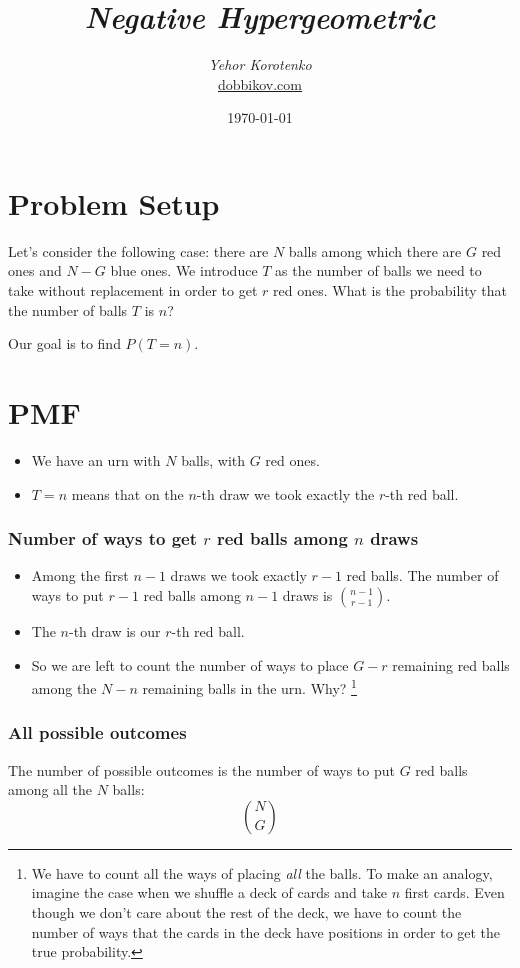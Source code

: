 \documentclass[12pt]{article}
\title{\textit{Negative Hypergeometric}}
\author{\textit{Yehor Korotenko}\\ \href{https://dobbikov.com}{dobbikov.com}}
\date{\today}
\begin{document}
\maketitle

\section*{Problem Setup}
Let's consider the following case: there are $N$ balls among which there are $G$
red ones and $N - G$ blue ones. We introduce $T$ as the number of balls we need
to take without replacement in order to get $r$ red ones. What is the probability 
that the number of balls $T$ is $n$?

Our goal is to find $P(T = n)$.

\section*{PMF}
\begin{itemize}
    \item We have an urn with $N$ balls, with $G$ red ones.
    \item $T = n$ means that on the $n$-th draw we took exactly the $r$-th red ball.
\end{itemize}

\subsubsection*{Number of ways to get $r$ red balls among $n$ draws}
\begin{itemize}
    \item Among the first $n-1$ draws we took exactly $r-1$ red balls. The number of ways 
    to put $r-1$ red balls among $n-1$ draws is $\binom{n-1}{r-1}$.
    \item The $n$-th draw is our $r$-th red ball.
    \item So we are left to count the number of ways to place $G-r$ remaining red balls among 
    the $N-n$ remaining balls in the urn. Why? \footnote{We have to count all the ways of placing 
    \emph{all} the balls. To make an analogy, imagine the case when we shuffle a deck of cards and take 
    $n$ first cards. Even though we don't care about the rest of the deck, we have to count the 
    number of ways that the cards in the deck have positions in order to get the true probability.}
\end{itemize}

\subsubsection*{All possible outcomes}
The number of possible outcomes is the number of ways to put $G$ red balls among all the $N$ balls:
\[
\binom{N}{G}
\]
\end{document}
